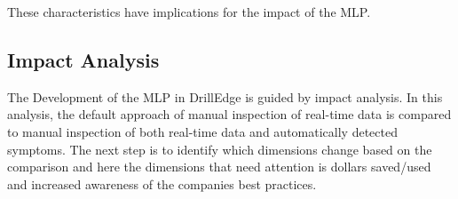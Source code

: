 \documentclass{article}
\begin{document}
These characteristics have implications for the impact of the MLP.


%

\subsection{Impact Analysis}

The Development of the MLP in DrillEdge is guided by impact analysis. 
In this analysis, the default approach of manual inspection of real-time data is compared to manual inspection of both real-time data and automatically detected symptoms.
The next step is to identify which dimensions change based on the comparison and here the dimensions that need attention is dollars saved/used and increased awareness of the companies best practices. 


\end{document}
